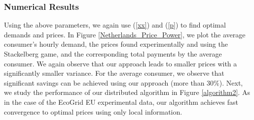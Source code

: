    \subsubsection{Numerical Results} Using the above parameters, we again use (\ref{xx}) and (\ref{p}) to find optimal demands and prices. In Figure \ref{Netherlands_Price_Power}, we plot the average consumer's hourly demand, the prices found experimentally and using the Stackelberg game, and the corresponding total payments by the average consumer. We again observe that our approach leads to smaller prices with a significantly smaller variance. For the average consumer, we observe that significant savings can be achieved using our approach (more than $30\%$). Next, we study the performance of our distributed algorithm in Figure \ref{algorithm2}. As in the case of the EcoGrid EU experimental data, our algorithm achieves fast convergence to optimal prices using only local information. 
   
 